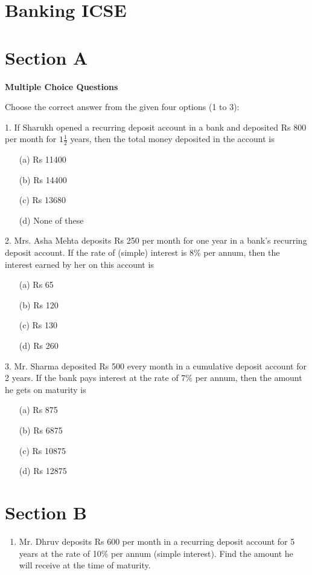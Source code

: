 \documentclass[12pt]{article}
\begin{document}
	\section*{Banking ICSE}
	\begin{multicols}{2}
		\section*{Section A}
		\textbf{Multiple Choice Questions}
		
		Choose the correct answer from the given four options (1 to 3):
		
		1. If Sharukh opened a recurring deposit account in a bank and deposited Rs 800 per month for \( 1\frac{1}{2} \) years, then the total money deposited in the account is
		\begin{enumerate}[label=(\alph*)]
			\item[(a)] Rs 11400
			\item[(b)] Rs 14400
			\item[(c)] Rs 13680
			\item[(d)] None of these
		\end{enumerate}
		
		2. Mrs. Asha Mehta deposits Rs 250 per month for one year in a bank's recurring deposit account. If the rate of (simple) interest is 8\% per annum, then the interest earned by her on this account is
		\begin{enumerate}[label=(\alph*)]
			\item[(a)] Rs 65
			\item[(b)] Rs 120
			\item[(c)] Rs 130
			\item[(d)] Rs 260
		\end{enumerate}
		
		3. Mr. Sharma deposited Rs 500 every month in a cumulative deposit account for 2 years. If the bank pays interest at the rate of 7\% per annum, then the amount he gets on maturity is
		\begin{enumerate}
			\item[(a)] Rs 875
			\item[(b)] Rs 6875
			\item[(c)] Rs 10875
			\item[(d)] Rs 12875
		\end{enumerate}
		
		\section*{Section B}
		\begin{enumerate}[label=(\alph*)]
			\item Mr. Dhruv deposits Rs 600 per month in a recurring deposit account for 5 years at the rate of 10\% per annum (simple interest). Find the amount he will receive at the time of maturity.
			

\end{enumerate}
\end{multicols}
\end{document}
